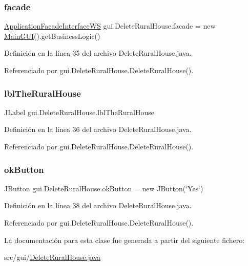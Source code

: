 \subsubsection{\texorpdfstring{facade}{facade}}
{\footnotesize\ttfamily \mbox{\hyperlink{interfacebusiness_logic_1_1_application_facade_interface_w_s}{Application\+Facade\+Interface\+WS}} gui.\+Delete\+Rural\+House.\+facade = new \mbox{\hyperlink{classgui_1_1_main_g_u_i}{Main\+G\+UI}}().get\+Business\+Logic()\hspace{0.3cm}{\ttfamily [private]}}



Definición en la línea 35 del archivo Delete\+Rural\+House.\+java.



Referenciado por gui.\+Delete\+Rural\+House.\+Delete\+Rural\+House().

\mbox{\label{classgui_1_1_delete_rural_house_ac96583ac0943e616bba9d5f39b56f10a}} 
\subsubsection{\texorpdfstring{lblTheRuralHouse}{lblTheRuralHouse}}
{\footnotesize\ttfamily J\+Label gui.\+Delete\+Rural\+House.\+lbl\+The\+Rural\+House\hspace{0.3cm}{\ttfamily [private]}}



Definición en la línea 36 del archivo Delete\+Rural\+House.\+java.



Referenciado por gui.\+Delete\+Rural\+House.\+Delete\+Rural\+House().

\mbox{\label{classgui_1_1_delete_rural_house_af2cf09ba446789ead0469867ede22bc7}} 
\subsubsection{\texorpdfstring{okButton}{okButton}}
{\footnotesize\ttfamily J\+Button gui.\+Delete\+Rural\+House.\+ok\+Button = new J\+Button(\char`\"{}Yes\char`\"{})\hspace{0.3cm}{\ttfamily [private]}}



Definición en la línea 38 del archivo Delete\+Rural\+House.\+java.



Referenciado por gui.\+Delete\+Rural\+House.\+Delete\+Rural\+House().



La documentación para esta clase fue generada a partir del siguiente fichero\+:\begin{DoxyCompactItemize}
\item 
src/gui/\mbox{\hyperlink{_delete_rural_house_8java}{Delete\+Rural\+House.\+java}}\end{DoxyCompactItemize}
